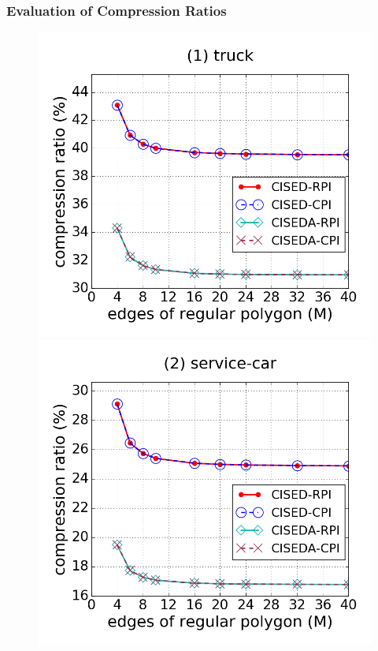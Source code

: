 \subsubsection{Evaluation of Compression Ratios}



\begin{figure}[tb!]
\centering
\includegraphics[scale = 0.250]{figures/Exp-M-e-20-CR-truck.png}
\includegraphics[scale = 0.250]{figures/Exp-M-e-20-CR-service.png}

\end{figure}
